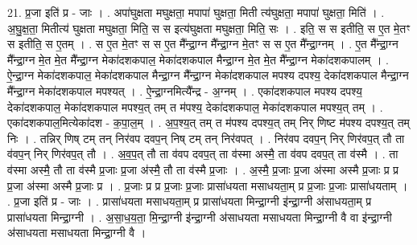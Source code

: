 \documentclass[17pt]{extarticle}
\begin{document}
21. प्र॒जा इति॑ प्र - जाः । . अपा॑घुक्षता मघुक्षता॒ मपापा॑ घुक्षता॒ मिती त्य॑घुक्षता॒ मपापा॑ घुक्षता॒ मिति॑ । . अ॒घु॒क्ष॒ता॒ मितीत्य॑ घुक्षता मघुक्षता॒ मिति॒ स स इत्य॑घुक्षता मघुक्षता॒ मिति॒ सः । . इति॒ स स इतीति॒ स ए॒त मे॒तꣳ स इतीति॒ स ए॒तम् । . स ए॒त मे॒तꣳ स स ए॒त मै᳚न्द्रा॒ग्न मै᳚न्द्रा॒ग्न मे॒तꣳ स स ए॒त मै᳚न्द्रा॒ग्नम् । . ए॒त मै᳚न्द्रा॒ग्न  मै᳚न्द्रा॒ग्न मे॒त मे॒त मै᳚न्द्रा॒ग्न मेका॑दशकपाल॒ मेका॑दशकपाल मैन्द्रा॒ग्न मे॒त मे॒त मै᳚न्द्रा॒ग्न मेका॑दशकपालम् । . ऐ॒न्द्रा॒ग्न मेका॑दशकपाल॒ मेका॑दशकपाल मैन्द्रा॒ग्न मै᳚न्द्रा॒ग्न मेका॑दशकपाल मपश्य दपश्य॒ देका॑दशकपाल मैन्द्रा॒ग्न मै᳚न्द्रा॒ग्न मेका॑दशकपाल मपश्यत् । . ऐ॒न्द्रा॒ग्नमित्यै᳚न्द्र - अ॒ग्नम् । . एका॑दशकपाल मपश्य दपश्य॒ देका॑दशकपाल॒ मेका॑दशकपाल मपश्य॒त् तम् त म॑पश्य॒ देका॑दशकपाल॒ मेका॑दशकपाल मपश्य॒त् तम् । . एका॑दशकपाल॒मित्येका॑दश - क॒पा॒ल॒म् । . अ॒प॒श्य॒त् तम् त म॑पश्य दपश्य॒त् तम् निर् णिष्ट म॑पश्य दपश्य॒त् तम् निः । . तन्निर् णिष् टम् तन् निर॑वप दवप॒न् निष् टम् तन् निर॑वपत् । . निर॑वप दवप॒न् निर् णिर॑वप॒त् तौ ता व॑वप॒न् निर् णिर॑वप॒त् तौ । . अ॒व॒प॒त् तौ ता व॑वप दवप॒त् ता व॑स्मा अस्मै॒ ता व॑वप दवप॒त् ता व॑स्मै । . ता व॑स्मा अस्मै॒ तौ ता व॑स्मै प्र॒जाः प्र॒जा अ॑स्मै॒ तौ ता व॑स्मै प्र॒जाः । . अ॒स्मै॒ प्र॒जाः प्र॒जा अ॑स्मा अस्मै प्र॒जाः प्र प्र प्र॒जा अ॑स्मा अस्मै प्र॒जाः प्र । . प्र॒जाः प्र प्र प्र॒जाः प्र॒जाः प्रासा॑धयता मसाधयता॒म् प्र प्र॒जाः प्र॒जाः प्रासा॑धयताम् । . प्र॒जा इति॑ प्र - जाः । . प्रासा॑धयता मसाधयता॒म् प्र प्रासा॑धयता मिन्द्रा॒ग्नी इ॑न्द्रा॒ग्नी अ॑साधयता॒म् प्र प्रासा॑धयता मिन्द्रा॒ग्नी । . अ॒सा॒ध॒य॒ता॒ मि॒न्द्रा॒ग्नी इ॑न्द्रा॒ग्नी अ॑साधयता मसाधयता मिन्द्रा॒ग्नी वै वा इ॑न्द्रा॒ग्नी अ॑साधयता मसाधयता मिन्द्रा॒ग्नी वै । \newline
\end{document}
